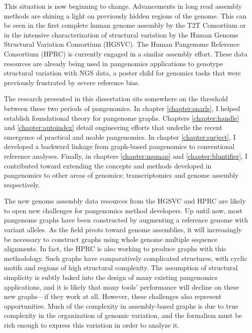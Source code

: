 \documentclass[11pt]{ucthesis}
\begin{document}
This situation is now beginning to change. Advancements in long read assembly methods are shining a light on previously hidden regions of the genome. This can be seen in the first complete human genome assembly by the T2T Consortium\cite{nurk2021complete} or in the intensive characterization of structural variation by the Human Genome Structural Variation Consortium (HGSVC)\cite{chaisson2019multi,ebert2021haplotype}. The Human Pangenome Reference Consortium (HPRC) is currently engaged in a similar assembly effort\cite{genomeweb2021hprc}. These data resources are already being used in pangenomics applications to genotype structural variation with NGS data\cite{ebler2020pangenome,siren2020genotyping}, a poster child for genomics tasks that were previously frustrated by severe reference bias.

The research presented in this dissertation sits somewhere on the threshold between these two periods of pangenomics. In chapter \ref{chapter:snarls}, I helped establish foundational theory for pangenome graphs. Chapters \ref{chapter:handle} and \ref{chapter:autoindex} detail engineering efforts that underlie the recent emergence of practical and usable pangenomics. In chapter \ref{chapter:surject}, I developed a backward linkage from graph-based pangenomics to conventional reference analyses. Finally, in chapters \ref{chapter:mpmap} and \ref{chapter:bluntifier}, I contributed toward extending the concepts and methods developed in pangenomics to other areas of genomics: transcriptomics and genome assembly respectively.

The new genome assembly data resources from the HGSVC and HPRC are likely to open new challenges for pangenomics method developers. Up until now, most pangenome graphs have been constructed by augmenting a reference genome with variant alleles\cite{garrison2018variation,kim2019graph}. As the field pivots toward genome assemblies, it will increasingly be necessary to construct graphs using whole genome multiple sequence alignments\cite{armstrong2020progressive,minkin2020scalable,li2020design}. In fact, the HPRC is also working to produce graphs with this methodology. Such graphs have comparatively complicated structures, with cyclic motifs and regions of high structural complexity. The assumption of structural simplicity is subtly baked into the design of many existing pangenomics applications, and it is likely that many tools' performance will decline on these new graphs---if they work at all. However, these challenges also represent opportunities. Much of the complexity in assembly-based graphs is due to true complexity in the organization of genomic variation, and the formalism must be rich enough to express this variation in order to analyze it.
\end{document}
